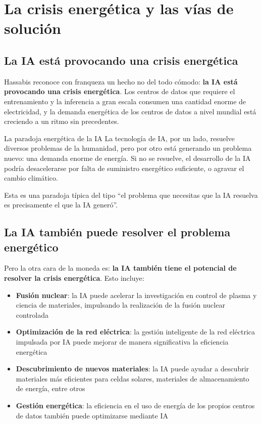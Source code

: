 \section{La crisis energética y las vías de solución}

\subsection{La IA está provocando una crisis energética}

Hassabis reconoce con franqueza un hecho no del todo cómodo: \textbf{la IA está provocando una crisis energética}. Los centros de datos que requiere el entrenamiento y la inferencia a gran escala consumen una cantidad enorme de electricidad, y la demanda energética de los centros de datos a nivel mundial está creciendo a un ritmo sin precedentes.

\begin{warningbox}{La paradoja energética de la IA}
La tecnología de IA, por un lado, resuelve diversos problemas de la humanidad, pero por otro está generando un problema nuevo: una demanda enorme de energía. Si no se resuelve, el desarrollo de la IA podría desacelerarse por falta de suministro energético suficiente, o agravar el cambio climático.

Esta es una paradoja típica del tipo ``el problema que necesitas que la IA resuelva es precisamente el que la IA generó''.
\end{warningbox}

\subsection{La IA también puede resolver el problema energético}

Pero la otra cara de la moneda es: \textbf{la IA también tiene el potencial de resolver la crisis energética}. Esto incluye:

\begin{itemize}
    \item \textbf{Fusión nuclear}: la IA puede acelerar la investigación en control de plasma y ciencia de materiales, impulsando la realización de la fusión nuclear controlada
    \item \textbf{Optimización de la red eléctrica}: la gestión inteligente de la red eléctrica impulsada por IA puede mejorar de manera significativa la eficiencia energética
    \item \textbf{Descubrimiento de nuevos materiales}: la IA puede ayudar a descubrir materiales más eficientes para celdas solares, materiales de almacenamiento de energía, entre otros
    \item \textbf{Gestión energética}: la eficiencia en el uso de energía de los propios centros de datos también puede optimizarse mediante IA
\end{itemize}

